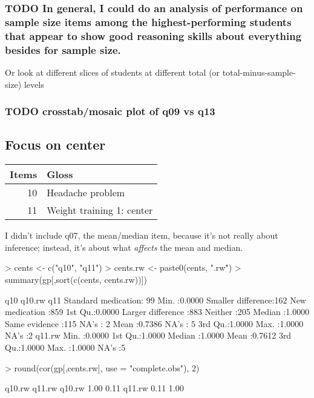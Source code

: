 \documentclass[11pt]{article}
\begin{document}
\subsubsection{{\bfseries\sffamily TODO} In general, I could do an analysis of performance on sample size items among the highest-performing students that appear to show good reasoning skills about everything besides for sample size.}
\label{sec-3-2-2}

Or look at different slices of students at different total (or total-minus-sample-size) levels

\subsubsection{{\bfseries\sffamily TODO} crosstab/mosaic plot of q09 vs q13}
\label{sec-3-2-3}

\subsection{Focus on center}
\label{sec-3-3}
\begin{center}
\begin{tabular}{rl}
\textbf{Items} & \textbf{Gloss}\\
\hline
10 & Headache problem\\
11 & Weight training 1: center\\
\end{tabular}
\end{center}

I didn't include q07, the mean/median item, because it's not really about inference; instead, it's about what \emph{affects} the mean and median.
\begin{Schunk}
\begin{Sinput}
> cents <- c("q10", "q11")
> cents.rw <- paste0(cents, ".rw")
> summary(gp[,sort(c(cents, cents.rw))])
\end{Sinput}
\begin{Soutput}
                  q10          q10.rw                       q11     
 Standard medication: 99   Min.   :0.0000   Smaller difference:162  
 New medication     :859   1st Qu.:0.0000   Larger difference :883  
 Neither            :205   Median :1.0000   Same evidence     :115  
 NA's               :  2   Mean   :0.7386   NA's              :  5  
                           3rd Qu.:1.0000                           
                           Max.   :1.0000                           
                           NA's   :2                                
     q11.rw      
 Min.   :0.0000  
 1st Qu.:1.0000  
 Median :1.0000  
 Mean   :0.7612  
 3rd Qu.:1.0000  
 Max.   :1.0000  
 NA's   :5       
\end{Soutput}
\begin{Sinput}
> round(cor(gp[,cents.rw], use = "complete.obs"), 2)
\end{Sinput}
\begin{Soutput}
       q10.rw q11.rw
q10.rw   1.00   0.11
q11.rw   0.11   1.00
\end{Soutput}
\end{Schunk}
\end{document}
